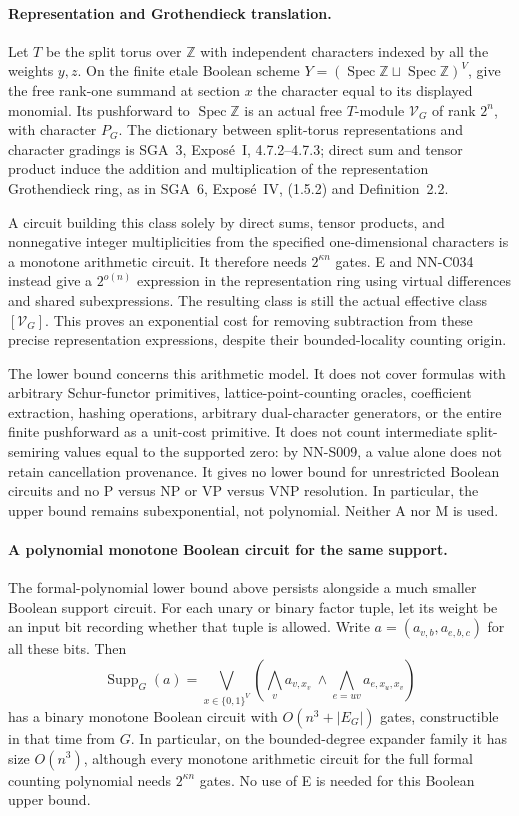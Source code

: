 \paragraph{Representation and Grothendieck translation.}
Let $T$ be the split torus over $\mathbb Z$ with independent
characters indexed by all the weights $y,z$. On the finite
etale Boolean scheme
$Y=(\operatorname{Spec}\mathbb Z\sqcup\operatorname{Spec}\mathbb Z)^V$,
give the free rank-one summand at section $x$ the character
equal to its displayed monomial. Its pushforward to
$\operatorname{Spec}\mathbb Z$ is an actual free $T$-module
$\mathcal V_G$ of rank $2^n$, with character $P_G$.
The dictionary between split-torus representations and
character gradings is SGA~3, Expos\'e~I,
4.7.2--4.7.3; direct sum and tensor product induce the
addition and multiplication of the representation
Grothendieck ring, as in SGA~6, Expos\'e~IV,
(1.5.2) and Definition~2.2.

A circuit building this class solely by direct sums,
tensor products, and nonnegative integer multiplicities
from the specified one-dimensional characters is a
monotone arithmetic circuit. It therefore needs
$2^{\kappa n}$ gates. E and NN-C034 instead give a
$2^{o(n)}$ expression in the representation ring using
virtual differences and shared subexpressions. The
resulting class is still the actual effective class
$[\mathcal V_G]$. This proves an exponential cost for
removing subtraction from these precise representation
expressions, despite their bounded-locality counting origin.

The lower bound concerns this arithmetic model. It does
not cover formulas with arbitrary Schur-functor primitives,
lattice-point-counting oracles, coefficient extraction,
hashing operations, arbitrary dual-character generators, or
the entire finite pushforward as a unit-cost primitive. It does not count intermediate
split-semiring values equal to the supported zero: by
NN-S009, a value alone does not retain cancellation
provenance. It gives no lower bound for unrestricted
Boolean circuits and no P versus NP or VP versus VNP
resolution. In particular, the upper bound remains
subexponential, not polynomial. Neither A nor M is used.


\paragraph{A polynomial monotone Boolean circuit for the same support.}
The formal-polynomial lower bound above persists alongside a much smaller
Boolean support circuit.  For each unary or binary factor tuple, let its
weight be an input bit recording whether that tuple is allowed.  Write
$a=(a_{v,b},a_{e,b,c})$ for all these bits.  Then
\[
 \operatorname{Supp}_G(a)=
 \bigvee_{x\in\{0,1\}^V}
       \left(\bigwedge_v a_{v,x_v}\ \wedge\!
                         \bigwedge_{e=uv}a_{e,x_u,x_v}\right)
\]
has a binary monotone Boolean circuit with $O(n^3+|E_G|)$ gates,
constructible in that time from $G$.  In particular, on the bounded-degree
expander family it has size $O(n^3)$, although every monotone arithmetic
circuit for the full formal counting polynomial needs $2^{\kappa n}$
gates.  No use of E is needed for this Boolean upper bound.

